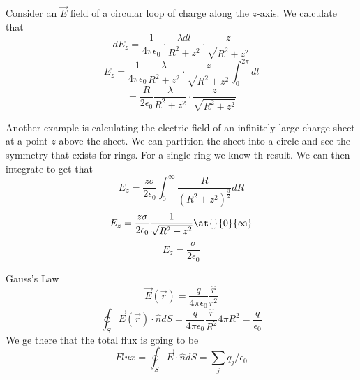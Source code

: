 \begin{eg}
Consider an \(\vec{E} \) field of a circular loop of charge along the \(z\)-axis. We calculate that 
\[
    dE_z = \frac{1}{4\pi \epsilon _0} \cdot \frac{\lambda dl}{R^{2} +z^{2} } \cdot \frac{z}{\sqrt{R^{2} +z^{2} } }
\]
\[
    E_z =  \frac{1}{4\pi \epsilon _0}  \frac{\lambda }{R^{2} +z^{2} } \cdot \frac{z}{\sqrt{R^{2} +z^{2} } } \int_0^{2\pi } dl
\]
\[
    = \frac{R}{2\epsilon _0}\frac{\lambda}{R^{2} +z^{2} } \cdot \frac{z}{\sqrt{R^{2} +z^{2} } }
\]

\end{eg}

\begin{eg}
Another example is calculating the electric field of an infinitely large charge sheet at a point \(z\) above the 
sheet. We can partition the sheet into a circle and see the symmetry that exists for rings. For a single ring we know th result. 
We can then integrate to get that 
\[
    E_z = \frac{z \sigma }{2\epsilon _0}\int_{0}^{\infty } \frac{R}{(R^{2} +z^{2} )^\frac{3}{2}} dR
\]
\[
    E_z = \frac{z \sigma }{2\epsilon _0} \frac{1}{\sqrt{R^{2} +z^{2} } } \at{}{0}{\infty } 
\]
\[
    E_z = \frac{\sigma}{2\epsilon _0}
\]
\end{eg}

\begin{remark}
    Gauss's Law
    \[
        \vec{E} (\vec{r} ) = \frac{q}{4\pi \epsilon _0} \frac{\hat{r} }{r^{2} }
    \]
    \[
        \oint _S \vec{E}  (\vec{r} ) \cdot \hat{n}  dS = \frac{q}{4\pi \epsilon _0} \frac{\hat{r} }{R^{2} } 4\pi R^{2}  = \frac{q}{\epsilon _0}
    \]
    We ge there that the total flux is going to be 
    \[
         Flux = \oint _S \vec{E}  \cdot \hat{n}  dS = \sum_{j} q_j /\epsilon _0
    \]
\end{remark}
